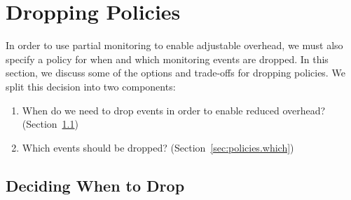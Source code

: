 \section{Dropping Policies} \label{sec:policies}

In order to use partial monitoring to enable adjustable overhead, we must also
specify a policy for when and which monitoring events are dropped. In this
section, we discuss some of the options and trade-offs for dropping policies.
We split this decision into two components: \begin{enumerate} \item When do we
need to drop events in order to enable reduced overhead?
(Section~\ref{sec:policies.when}) \item Which events should be dropped?
(Section~\ref{sec:policies.which}) \end{enumerate}


\subsection{Deciding When to Drop} 
\label{sec:policies.when}

